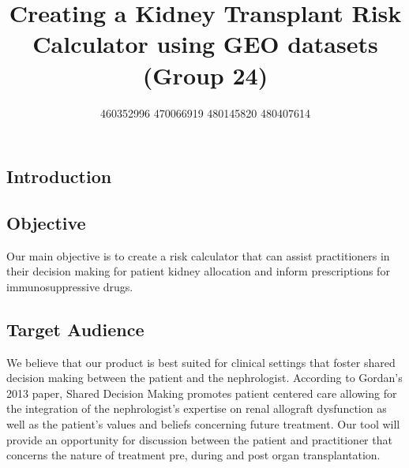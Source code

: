 \documentclass[a4paper,9pt,twocolumn,twoside,]{pinp}
\title{Creating a Kidney Transplant Risk Calculator using GEO datasets (Group
24)}
\author[]{460352996 470066919 480145820 480407614}
\affil[]{GitHub code repository is
\href{https://github.sydney.edu.au/aauw2900/DATA3888FinalProject}{here}}
\begin{document}
\verticaladjustment{-2pt}

\maketitle
\thispagestyle{firststyle}



\hypertarget{introduction}{%
\subsection{Introduction}\label{introduction}}

\hypertarget{objective}{%
\subsection{Objective}\label{objective}}

Our main objective is to create a risk calculator that can assist
practitioners in their decision making for patient kidney allocation and
inform prescriptions for immunosuppressive drugs.

\hypertarget{target-audience}{%
\subsection{Target Audience}\label{target-audience}}

We believe that our product is best suited for clinical settings that
foster shared decision making between the patient and the nephrologist.
According to Gordan's 2013 paper, Shared Decision Making promotes
patient centered care allowing for the integration of the nephrologist's
expertise on renal allograft dysfunction as well as the patient's values
and beliefs concerning future treatment. Our tool will provide an
opportunity for discussion between the patient and practitioner that
concerns the nature of treatment pre, during and post organ
transplantation.
\end{document}
